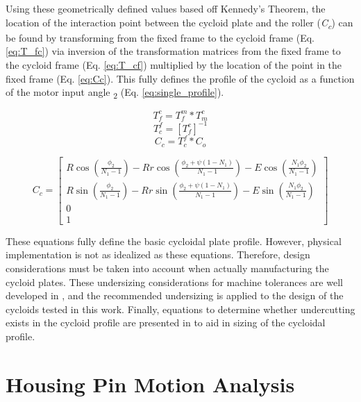 Using these geometrically defined values based off Kennedy's Theorem, the location of the interaction point between the cycloid plate and the roller (\textit{C\textsubscript{c}}) can be found by transforming from the fixed frame to the cycloid frame (Eq. \ref{eq:T_fc}) via inversion of the transformation matrices from the fixed frame to the cycloid frame (Eq. \ref{eq:T_cf}) multiplied by the location of the point in the fixed frame (Eq. \ref{eq:Cc}). This fully defines the profile of the cycloid as a function of the motor input angle \textphi\textsubscript{2} (Eq. \ref{eq:single_profile}).

\begin{equation} \label{eq:T_fc}
T_f^c = T_f^m * T_m^c 
\end{equation}
\begin{equation} \label{eq:T_cf}
T_c^f = \left[{T_f^c}\right]^{-1}
\end{equation}
\begin{equation} \label{eq:Cc}
C_c = T_c^f * C_o
\end{equation}

\begin{equation} \label{eq:single_profile}
C_c = \left[\begin{array}{c}
		R\cos(\frac{\phi_2}{N_1 -1}) - Rr\cos(\frac{\phi_2 + \psi(1-N_1)}{N_1-1}) - E\cos(\frac{N_1\phi_2}{N_1-1})\\
		R\sin(\frac{\phi_2}{N_1 -1}) - Rr\sin(\frac{\phi_2 + \psi(1-N_1)}{N_1-1}) - E\sin(\frac{N_1\phi_2}{N_1-1})\\
		0\\
		1
		\end{array} \right]
\end{equation}

These equations fully define the basic cycloidal plate profile. However, physical implementation is not as idealized as these equations. Therefore, design considerations must be taken into account when actually manufacturing the cycloid plates. These undersizing considerations for machine tolerances are well developed in \cite{ref:design_and_application}, and the recommended undersizing is applied to the design of the cycloids tested in this work. Finally, equations to determine whether undercutting exists in the cycloid profile are presented in \cite{ref:ye} to aid in sizing of the cycloidal profile. 




\section{Housing Pin Motion Analysis} \label{ch:design:pin_roll_1s}

